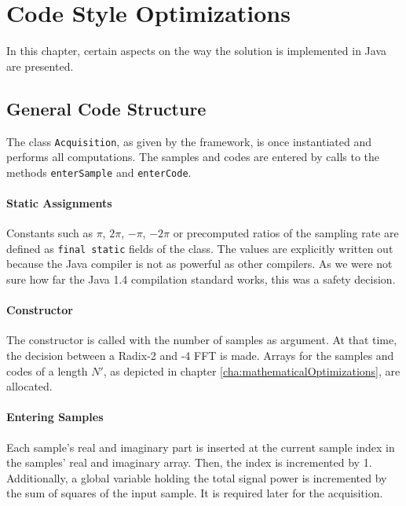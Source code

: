 \chapter{Code Style Optimizations}
\label{cha:codeOptimization}

In this chapter, certain aspects on the way the solution is implemented in Java are presented. 

\section{General Code Structure}
\label{sec:generalCodeStructure}

The class \texttt{Acquisition}, as given by the framework, is once instantiated and performs all computations. The samples and codes are entered by calls to the methods \texttt{enterSample} and \texttt{enterCode}.

\subsubsection{Static Assignments}
\label{subsubsec:staticAssignments}

Constants such as $\pi$, $2\pi$, $-\pi$, $-2\pi$ or precomputed ratios of the sampling rate are defined as \texttt{final static} fields of the class. The values are explicitly written out because the Java compiler is not as powerful as other compilers. As we were not sure how far the Java 1.4 compilation standard works, this was a safety decision.

\subsubsection{Constructor}
\label{subsubsec:constructor}

The constructor is called with the number of samples as argument. At that time, the decision between a Radix-2 and -4 FFT is made. Arrays for the samples and codes of a length $N'$, as depicted in chapter \ref{cha:mathematicalOptimizations}, are allocated. 

\subsubsection{Entering Samples}
\label{subsubsec:enterSamples}
Each sample's real and imaginary part is inserted at the current sample index in the samples' real and imaginary array. Then, the index is incremented by 1. Additionally, a global variable holding the total signal power is incremented by the sum of squares of the input sample. It is required later for the acquisition.

